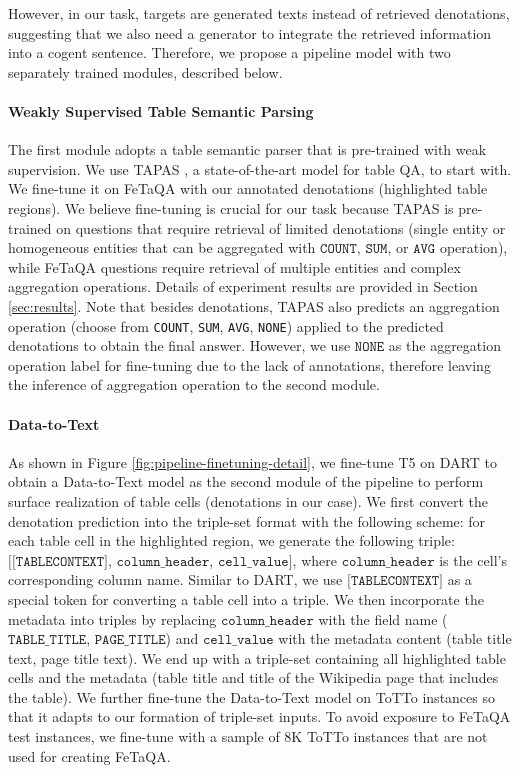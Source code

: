 \documentclass[11pt,a4paper]{article}
\newcommand{\ours}{FeTaQA\xspace}
\begin{document}
However, in our task, targets are generated texts instead of retrieved denotations, suggesting that we also need a generator to integrate the retrieved information into a cogent sentence.
Therefore, we propose a pipeline model with two separately trained modules, described below. 

\paragraph{Weakly Supervised Table Semantic Parsing}
The first module adopts a table semantic parser that is pre-trained with weak supervision. We use TAPAS \cite{herzig-etal-2020-tapas}, a state-of-the-art model for table QA, to start with. We fine-tune it on \ours with our annotated denotations (highlighted table regions). We believe fine-tuning is crucial for our task because TAPAS is pre-trained on questions that require retrieval of limited denotations (single entity or homogeneous entities that can be aggregated with $\texttt{COUNT}$, $\texttt{SUM}$, or $\texttt{AVG}$ operation), while \ours questions require retrieval of multiple entities and complex aggregation operations. Details of experiment results are provided in Section \ref{sec:results}.
Note that besides denotations, TAPAS also predicts an aggregation operation (choose from \texttt{COUNT}, \texttt{SUM}, \texttt{AVG}, \texttt{NONE}) applied to the predicted denotations to obtain the final answer. However, we use $\texttt{NONE}$ as the aggregation operation label for fine-tuning due to the lack of annotations, therefore leaving the inference of aggregation operation to the second module.  

\paragraph{Data-to-Text}
\label{sec:data-to-text}
As shown in Figure \ref{fig:pipeline-finetuning-detail}, we fine-tune T5 \cite{raffel-2019-t5} on DART \cite{dart} to obtain a Data-to-Text model as the second module of the pipeline to perform surface realization of table cells (denotations in our case). We first convert the denotation prediction into the triple-set format with the following scheme: for each table cell in the highlighted region, we generate the following triple: $\big[\texttt{[TABLECONTEXT]}$, $\texttt{column\_header}$, $\texttt{cell\_value} \big]$, where $\texttt{column\_header}$ is the cell's corresponding column name. Similar to DART, we use $\texttt{[TABLECONTEXT]}$ as a special token for converting a table cell into a triple. We then incorporate the metadata into triples by replacing $\texttt{column\_header}$ with the field name ($\texttt{TABLE\_TITLE}$, $\texttt{PAGE\_TITLE}$) and $\texttt{cell\_value}$ with the metadata content (table title text, page title text).
We end up with a triple-set containing all highlighted table cells and the metadata (table title and title of the Wikipedia page that includes the table). We further fine-tune the Data-to-Text model on ToTTo 
instances so that it adapts to our formation of triple-set inputs. 
To avoid exposure to \ours test instances, we fine-tune with a sample of 8K ToTTo instances that are not used for creating \ours.  
 
\end{document}

